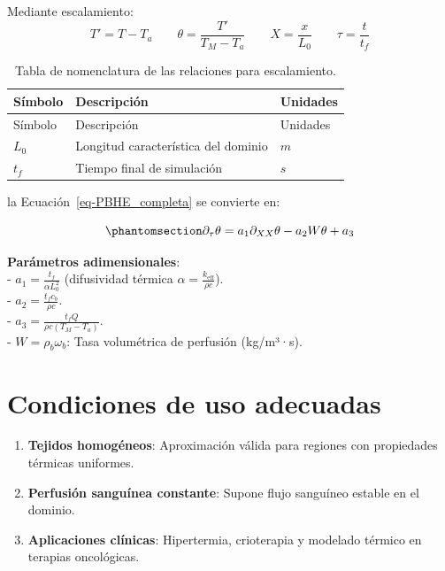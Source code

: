 \documentclass[
  spanish,
  us-letterpaper,
  DIV=11,
  numbers=noendperiod]{scrreprt}
\providecommand{\tightlist}{%
  \setlength{\itemsep}{0pt}\setlength{\parskip}{0pt}}
\theoremstyle{plain}
\theoremstyle{definition}
\theoremstyle{remark}
\begin{document}
Mediante escalamiento: \begin{equation*}
T' = T - T_a \qquad \theta = \dfrac{T'}{T_M - T_a} \qquad X = \dfrac{x}{L_0} \qquad \tau = \dfrac{t}{t_f}
\end{equation*}

\begin{longtable}[]{@{}lll@{}}
\caption{Tabla de nomenclatura de las relaciones para
escalamiento.}\label{tbl-}\tabularnewline
\toprule\noalign{}
Símbolo & Descripción & Unidades \\
\midrule\noalign{}
\endfirsthead
\toprule\noalign{}
Símbolo & Descripción & Unidades \\
\midrule\noalign{}
\endhead
\bottomrule\noalign{}
\endlastfoot
\(L_0\) & Longitud característica del dominio & \(m\) \\
\(t_f\) & Tiempo final de simulación & \(s\) \\
\end{longtable}

la Ecuación~\ref{eq-PBHE_completa} se convierte en:

\begin{equation}\phantomsection\label{eq-PBHE-reduced}{
\partial_{\tau} \theta = a_1 \partial_{XX} \theta - a_2 W \theta + a_3
}\end{equation}

\textbf{Parámetros adimensionales}:\\
- \(a_1 = \frac{t_f}{\alpha L_0^2}\) (difusividad térmica
\(\alpha = \frac{k_{\text{eff}}}{\rho c}\)).\\
- \(a_2 = \frac{t_f c_b}{\rho c}\).\\
- \(a_3 = \frac{t_f Q}{\rho c (T_M - T_a)}\).\\
- \(W = \rho_b \omega_b\): Tasa volumétrica de perfusión (kg/m³·s).

\section{Condiciones de uso
adecuadas}\label{condiciones-de-uso-adecuadas}

\begin{enumerate}
\def\labelenumi{\arabic{enumi}.}
\tightlist
\item
  \textbf{Tejidos homogéneos}: Aproximación válida para regiones con
  propiedades térmicas uniformes.\\
\item
  \textbf{Perfusión sanguínea constante}: Supone flujo sanguíneo estable
  en el dominio.\\
\item
  \textbf{Aplicaciones clínicas}: Hipertermia, crioterapia y modelado
  térmico en terapias oncológicas.
\end{enumerate}
\end{document}
